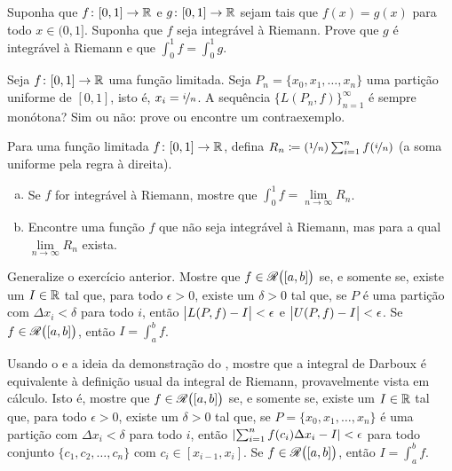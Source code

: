 \begin{exercise}
Suponha que $f \colon [0,1] \to {\mathbb{R}}$ e $g \colon [0,1] \to {\mathbb{R}}$
sejam tais que $f(x) = g(x)$ para todo $x \in (0,1]$.
Suponha que $f$ seja integrável à Riemann.
Prove que $g$ é integrável à Riemann e que $\int_{0}^1 f = \int_{0}^1 g$.
\end{exercise}

\begin{exercise}
Seja $f \colon [0,1] \to {\mathbb{R}}$ uma função limitada.
Seja $P_n = \{ x_0,x_1,\ldots,x_n \}$ uma partição uniforme de $[0,1]$,
isto é, $x_i = \nicefrac{i}{n}$. A sequência $\bigl\{ L(P_n,f) \bigr\}_{n=1}^\infty$
é sempre monótona? Sim ou não: prove ou encontre um contraexemplo.
\end{exercise}

\begin{exercise}[Desafiador]
Para uma função limitada $f \colon [0,1] \to {\mathbb{R}}$, defina
$R_n \coloneqq (\nicefrac{1}{n})\sum_{i=1}^n f(\nicefrac{i}{n})$ (a
soma uniforme pela regra à direita).
\begin{enumerate}[a)]
\item
Se $f$ for integrável à Riemann, mostre que
$\int_0^1 f = \lim\limits_{n\to\infty} R_n$.
\item
Encontre uma função $f$ que não seja integrável à Riemann, mas para a qual
$\lim\limits_{n\to\infty} R_n$ exista.
\end{enumerate}
\end{exercise}

\begin{exercise}[Desafiador] \label{exercise:riemannintdarboux}
Generalize o exercício anterior.
Mostre que $f \in {\mathscr{R}}\bigl([a,b]\bigr)$ se, e somente se, existe um $I \in {\mathbb{R}}$
tal que, para todo $\epsilon > 0$, existe
um $\delta > 0$ tal que, se $P$ é uma partição com $\Delta x_i < \delta$
para todo $i$, então
$\bigl\lvert {L(P,f) - I} \bigr\rvert < \epsilon$ e
$\bigl\lvert {U(P,f) - I} \bigr\rvert < \epsilon$. Se $f \in {\mathscr{R}}\bigl([a,b]\bigr)$, então $I = \int_a^b f$.
\end{exercise}

\begin{exercise}
Usando o  e a ideia da demonstração
do , mostre que a integral de Darboux
é equivalente à definição usual da integral de Riemann, provavelmente vista
em cálculo. Isto é, mostre que
$f \in {\mathscr{R}}\bigl([a,b]\bigr)$ se, e somente se, existe um $I \in {\mathbb{R}}$
tal que, para todo $\epsilon > 0$, existe
um $\delta > 0$ tal que, se $P = \{ x_0,x_1,\ldots,x_n \}$
é uma partição com $\Delta x_i < \delta$
para todo $i$, então
$\left\lvert {\sum_{i=1}^n f(c_i) \Delta x_i - I} \right\rvert < \epsilon$ para todo conjunto
$\{ c_1,c_2,\ldots,c_n \}$ com $c_i \in [x_{i-1},x_i]$.
Se $f \in {\mathscr{R}}\bigl([a,b]\bigr)$, então $I = \int_a^b f$.
\end{exercise}



